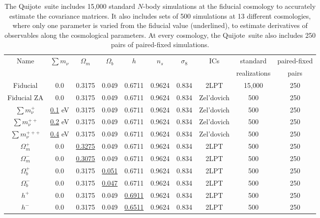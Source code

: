 \documentclass[12pt, letterpaper, preprint]{aastex62}
\newcommand{\smnu}{\sum m_\nu}
\newcommand{\quij}{{\sc Quijote}~}
\begin{document}
\begin{table}
    \caption{
    The \quij suite includes 15,000 standard $N$-body simulations at the fiducial cosmology to 
    accurately estimate the covariance matrices. It also includes sets of 500 simulations at 13 
    different cosmologies, where only one parameter is varied from the fiducial value (underlined), 
    to estimate derivatives of observables along the cosmological parameters. At every cosmology,
    the \quij suite also includes 250 pairs of paired-fixed simulations.  
    } 
    \begin{center}
    \begin{tabular}{cccccccccc} \toprule
    Name  &$\smnu$ & $\Omega_m$ & $\Omega_b$ & $h$ & $n_s$ & $\sigma_8$ & ICs & standard & paired-fixed \\
    & & & & & & & & realizations & pairs \\[3pt] \hline\hline
    Fiducial 	& 0.0         & 0.3175 & 0.049 & 0.6711 & 0.9624 & 0.834 & 2LPT & 15,000 & 250\\ 
    Fiducial ZA     & 0.0         & 0.3175 & 0.049 & 0.6711 & 0.9624 & 0.834 & Zel'dovich& 500 & 250\\ 
    $\smnu^+$       & \underline{0.1} eV & 0.3175 & 0.049 & 0.6711 & 0.9624 & 0.834 & Zel'dovich & 500 & 250\\ 
    $\smnu^{++}$    & \underline{0.2} eV & 0.3175 & 0.049 & 0.6711 & 0.9624 & 0.834 & Zel'dovich & 500 & 250\\ 
    $\smnu^{+++}$   & \underline{0.4} eV & 0.3175 & 0.049 & 0.6711 & 0.9624 & 0.834 & Zel'dovich & 500 & 250\\ 
    $\Omega_m^+$    & 0.0   & \underline{ 0.3275} & 0.049 & 0.6711 & 0.9624 & 0.834 & 2LPT & 500 & 250\\ 
    $\Omega_m^-$    & 0.0   & \underline{ 0.3075} & 0.049 & 0.6711 & 0.9624 & 0.834 & 2LPT & 500 & 250\\ 
    $\Omega_b^+$    & 0.0   & 0.3175 & \underline{0.051} & 0.6711 & 0.9624 & 0.834 & 2LPT & 500 & 250\\ 
    $\Omega_b^-$    & 0.0   & 0.3175 & \underline{0.047} & 0.6711 & 0.9624 & 0.834 & 2LPT & 500 & 250\\ 
    $h^+$           & 0.0   & 0.3175 & 0.049 & \underline{0.6911} & 0.9624 & 0.834 & 2LPT & 500 & 250\\ 
    $h^-$           & 0.0   & 0.3175 & 0.049 & \underline{0.6511} & 0.9624 & 0.834 & 2LPT & 500 & 250\\ 

\end{tabular}
\end{center}
\end{table}
\end{document}
